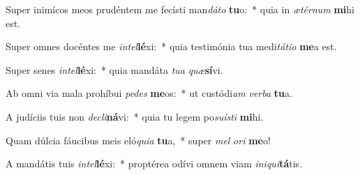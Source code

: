 \item Super inimícos meos prudéntem me fecísti man\textit{dá}\textit{to} \textbf{tu}o:~* quia in \textit{æ}\textit{tér}\textit{num} \textbf{mi}hi est.
\item Super omnes docéntes me \textit{in}\textit{tel}\textbf{lé}xi:~* quia testimónia tua medi\textit{tá}\textit{ti}\textit{o} \textbf{me}a est.
\item Super senes \textit{in}\textit{tel}\textbf{lé}xi:~* quia mandáta \textit{tu}\textit{a} \textit{quæ}\textbf{sí}vi.
\item Ab omni via mala prohíbui \textit{pe}\textit{des} \textbf{me}os:~* ut custódi\textit{am} \textit{ver}\textit{ba} \textbf{tu}a.
\item A judíciis tuis non \textit{de}\textit{cli}\textbf{ná}vi:~* quia tu legem po\textit{su}\textit{ís}\textit{ti} \textbf{mi}hi.
\item Quam dúlcia fáucibus meis eló\textit{qui}\textit{a} \textbf{tu}a,~* super \textit{mel} \textit{o}\textit{ri} \textbf{me}o!
\item A mandátis tuis \textit{in}\textit{tel}\textbf{lé}xi:~* proptérea odívi omnem viam \textit{in}\textit{i}\textit{qui}\textbf{tá}tis.
